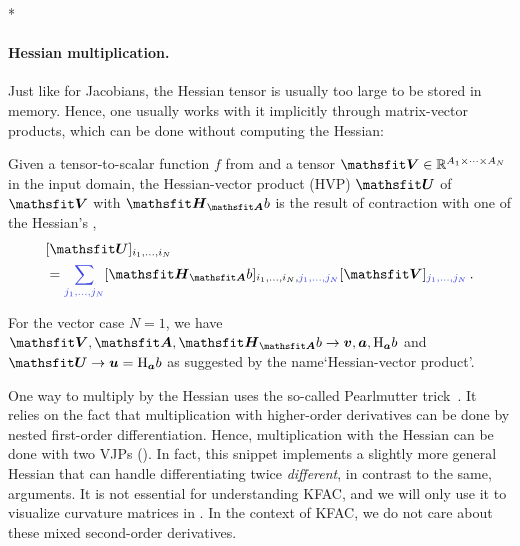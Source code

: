 \switchcolumn[1]*
\switchcolumn[0]

\paragraph{Hessian multiplication.}
Just like for Jacobians, the Hessian tensor is usually too large to be stored in memory.
Hence, one usually works with it implicitly through matrix-vector products, which can be done without computing the Hessian:

\begin{definition}\label{def:hvp}
  Given a tensor-to-scalar function $f$ from  and a tensor $\tV \in \sR^{A_1 \times \dots \times A_N}$ in the input domain, the Hessian-vector product (HVP) $\tU$ of $\tV$ with $\tH_{\tA}b$ is the result of contraction with one of the Hessian's ,
  \begin{align*}
     & [\tU]_{i_1, \dots, i_N}
    \\
     & =
    \colored{\sum_{j_1, \dots, j_N}}
    [\tH_{\tA}b]_{i_1, \dots, i_N, \colored{j_1, \dots, j_N}} [\tV]_{\colored{j_1, \dots, j_N}}\,.
  \end{align*}
\end{definition}
For the vector case $N=1$, we have $\tV, \tA, \tH_{\tA}b \to \vv, \va, \hess_{\va}b$ and $\tU \to \vu = \hess_{\va} b$ as suggested by the name`Hessian-vector product'.

One way to multiply by the Hessian uses the so-called Pearlmutter trick~\cite{pearlmutter1994fast}.
It relies on the fact that multiplication with higher-order derivatives can be done by nested first-order differentiation.
Hence, multiplication with the Hessian can be done with two VJPs ().
In fact, this snippet implements a slightly more general Hessian that can handle differentiating twice \wrt \emph{different}, in contrast to the same, arguments.
It is not essential for understanding KFAC, and we will only use it to visualize curvature matrices in .
In the context of KFAC, we do not care about these mixed second-order derivatives.

